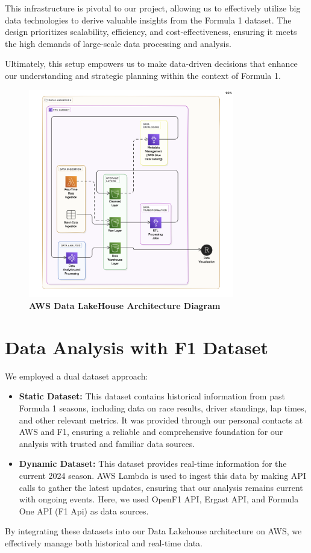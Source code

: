 \documentclass{article}
\begin{document}
This infrastructure is pivotal to our project, allowing us to effectively utilize big data technologies to derive valuable insights from the Formula 1 dataset. The design prioritizes scalability, efficiency, and cost-effectiveness, ensuring it meets the high demands of large-scale data processing and analysis. 

Ultimately, this setup empowers us to make data-driven decisions that enhance our understanding and strategic planning within the context of Formula 1.

\begin{figure}[H]
    \centering
    \includegraphics[width=0.8\textwidth]{images/arch/AWS-GridGuru-LakeHouseArchitecture.png}
    \caption{\textbf{AWS Data LakeHouse Architecture Diagram}}
\end{figure}

\section{Data Analysis with F1 Dataset}

We employed a dual dataset approach:

\begin{itemize}
    \item \textbf{Static Dataset:} This dataset contains historical information from past Formula 1 seasons, including data on race results, driver standings, lap times, and other relevant metrics. It was provided through our personal contacts at AWS and F1, ensuring a reliable and comprehensive foundation for our analysis with trusted and familiar data sources.
    \item \textbf{Dynamic Dataset:} This dataset provides real-time information for the current 2024 season. AWS Lambda is used to ingest this data by making API calls to gather the latest updates, ensuring that our analysis remains current with ongoing events. Here, we used OpenF1 API, Ergast API, and Formula One API (F1 Api) as data sources.
\end{itemize}
By integrating these datasets into our Data Lakehouse architecture on AWS, we effectively manage both historical and real-time data. 
\end{document}
